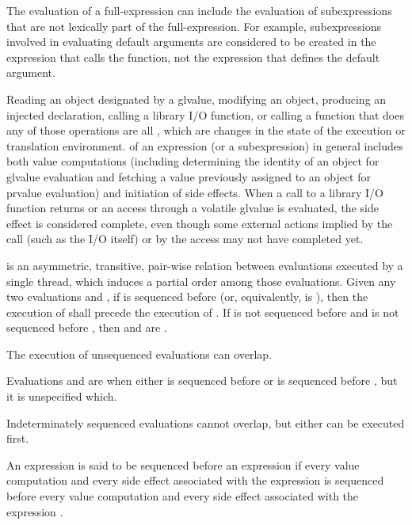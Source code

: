 \pnum
\begin{note}
The evaluation of a full-expression can include the
evaluation of subexpressions that are not lexically part of the
full-expression. For example, subexpressions involved in evaluating
default arguments are considered to
be created in the expression that calls the function, not the expression
that defines the default argument.
\end{note}

\pnum
{}%
Reading an object designated by a  glvalue,
modifying an object,
producing an injected declaration,
calling a library I/O function, or
calling a function that does any of those operations
are all ,
which are changes in the state of the execution or translation environment.
 of an expression (or a
subexpression) in general includes both value computations (including
determining the identity of an object for glvalue evaluation and fetching
a value previously assigned to an object for prvalue evaluation) and
initiation of side effects. When a call to a library I/O function
returns or an access through a volatile glvalue is evaluated, the side
effect is considered complete, even though some external actions implied
by the call (such as the I/O itself) or by the  access
may not have completed yet.

\pnum
{} is an asymmetric, transitive, pair-wise relation between
evaluations executed by a single thread, which induces
a partial order among those evaluations. Given any two evaluations  and
, if  is sequenced before 
(or, equivalently,  is  ),
then the execution of
 shall precede the execution of . If  is not sequenced
before  and  is not sequenced before , then  and
 are .
\begin{note}
The execution of unsequenced
evaluations can overlap.
\end{note}
Evaluations  and  are
 when either  is sequenced before
 or  is sequenced before , but it is unspecified which.
\begin{note}
Indeterminately sequenced evaluations cannot overlap, but either
can be executed first.
\end{note}
An expression 
is said to be sequenced before
an expression  if
every value computation and every side effect
associated with the expression 
is sequenced before
every value computation and every side effect
associated with the expression .

